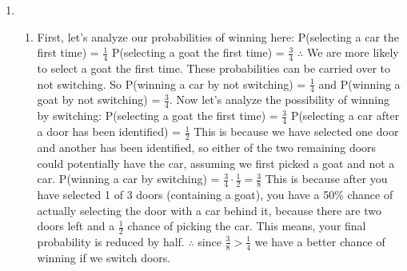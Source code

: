 \documentclass[11pt]{article}
\begin{document}
\begin{flushleft}
		\begin{enumerate}
			
			\item {
				      
				      \begin{enumerate}
				      	\item { %
				      		      First, let's analyze our probabilities of winning here:\linebreak
				      		      P(selecting a car the first time) = $\frac{1}{4}$\linebreak
				      		      P(selecting a goat the first time) = $\frac{3}{4}$\linebreak\linebreak
				      		      $\therefore$ We are more likely to select a goat the first time. These probabilities can be carried over to not switching. So P(winning a car by not switching) = $\frac{1}{4}$ and P(winning a goat by not switching) = $\frac{3}{4}$. Now let's analyze the possibility of winning by switching:\linebreak\linebreak
				      		      P(selecting a goat the first time) =  $\frac{3}{4}$\linebreak
				      		      P(selecting a car after a door has been identified) = $\frac{1}{2}$\linebreak
				      		      This is because we have selected one door and another has been identified, so either of the two remaining doors could potentially have the car, assuming we first picked a goat and not a car.\linebreak\linebreak
				      		      P(winning a car by switching) = $\frac{3}{4}\cdot \frac{1}{2} = \frac{3}{8}$\linebreak
				      		      This is because after you have selected 1 of 3 doors (containing a goat), you have a 50\% chance of actually selecting the door with a car behind it, because there are two doors left and a $\frac{1}{2}$ chance of picking the car. This means, your final probability is reduced by half. \linebreak\linebreak
				      		      $\therefore$ since $\frac{3}{8} > \frac{1}{4}$ we have a better chance of winning if we switch doors.
				      		}
				      		

\end{enumerate}}
\end{enumerate}
\end{flushleft}
\end{document}
